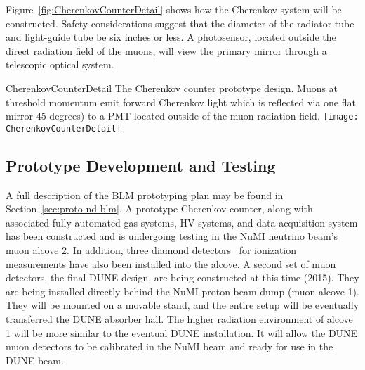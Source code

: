 Figure~\ref{fig:CherenkovCounterDetail} shows how the
Cherenkov system will be constructed. Safety considerations suggest that the
diameter of the radiator tube and light-guide tube be six inches
or less.  A 
photosensor, located outside the direct radiation field of the muons, will
view the primary mirror through a telescopic optical system.

\begin{cdrfigure}{CherenkovCounterDetail}
{The Cherenkov counter prototype design. 
Muons at threshold momentum emit forward Cherenkov light which is
reflected via one flat mirror 45 degrees) to a PMT located outside of the muon
radiation field.}
\texttt{[image: CherenkovCounterDetail]}
\end{cdrfigure}

\subsection{Prototype Development and Testing}
\label{subsec:nd-blm-muon-cherenkov-proto}

A full description of the BLM prototyping plan may be found in Section~\ref{sec:proto-nd-blm}.
A prototype Cherenkov counter, along with associated fully automated gas systems,
HV systems, and data acquisition system has been constructed and is undergoing
testing in the NuMI neutrino beam's muon alcove 2. In addition, three diamond
detectors~\cite{ref:CERNdiamond} for ionization measurements have also been installed into the alcove.
A second set of muon detectors, the final DUNE design, are being constructed at this time (2015). They are being installed directly behind the NuMI proton beam dump (muon alcove 1). They will be mounted on a movable stand, and the entire setup will be eventually transferred the DUNE absorber hall. The higher radiation environment of alcove 1 will be more similar to the eventual DUNE installation. It will allow the DUNE muon detectors to be calibrated in the NuMI beam and ready for use in the DUNE beam.


